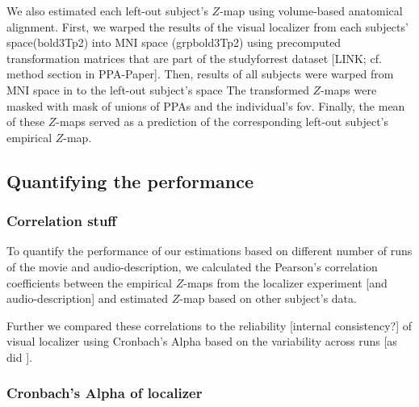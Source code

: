 %
We also estimated each left-out subject's $Z$-map using volume-based anatomical
alignment.
First, we warped the results of the visual localizer from each subjects'
space(bold3Tp2) into MNI space (grpbold3Tp2) using precomputed transformation
matrices that are part of the studyforrest dataset [LINK; cf. method section in
PPA-Paper].
Then, results of all subjects were warped from MNI space in to the left-out
subject's space
%
The transformed $Z$-maps were masked with mask of unions of PPAs and the
individual's \ac{fov}.
%
Finally, the mean of these $Z$-maps served as a prediction of the corresponding
left-out subject's empirical $Z$-map.


\subsection{Quantifying the performance}


\subsubsection{Correlation stuff}

%
To quantify the performance of our estimations based on different number of runs
of the movie and audio-description, we calculated the Pearson's correlation
coefficients between the empirical $Z$-maps from the localizer experiment [and
audio-description] and estimated $Z$-map based on other subject's data.

%
Further we compared these correlations to the reliability [internal
consistency?] of visual localizer using Cronbach's Alpha based on the
variability across runs [as did
\citep{jiahui2020predicting}].

\subsubsection{Cronbach's Alpha of localizer}




